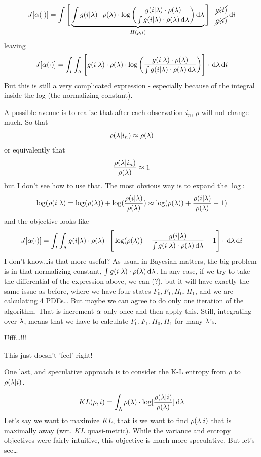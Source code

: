 \documentclass{article}
\begin{document}
$$
J[{\alpha}(\cdot)] =
\int
 \Bigg[\underbrace{
\int {g(i| {\lambda}) \cdot \rho({\lambda})}
		\cdot \log\bigg( \frac{g(i| {\lambda}) \cdot \rho({\lambda})}
		{\int g(i| {\lambda}) \cdot \rho({\lambda}) \, \mathrm{d} {\lambda}} \bigg)
		 \, \mathrm{d} {\lambda}}_{H(\rho,i)}
			   \Bigg]
					  \cdot
					  \frac{\cancel{g(i)}}{\cancel{g(i)}}
					   \, \mathrm{d} i		
					   $$
leaving
$$
J[{\alpha}(\cdot)] =
\int_I
\int_\Lambda
 \Bigg[
 {g(i| {\lambda}) \cdot \rho({\lambda})}
		\cdot \log\bigg( \frac{g(i| {\lambda}) \cdot \rho({\lambda})}
		{\int g(i| {\lambda}) \cdot \rho({\lambda}) \, \mathrm{d} {\lambda}} \bigg)
			   \Bigg]
					  \cdot
		 \, \mathrm{d} {\lambda}
	   \, \mathrm{d} i		
$$
But this is still a very complicated expression - especially because of the integral
inside the log (the normalizing constant).

A possible avenue is to realize that after each observation $i_n$, $\rho$ will
not change much. So that 
$$
\rho ({\lambda} | i_n) \approx \rho({\lambda})
$$
or equivalently that
$$
\frac{\rho ({\lambda} | i_n)}{ \rho({\lambda})} \approx 1
$$
but I don't see how to use that. The most obvious way is to expand the $\log$:
$$
\log(\rho(i|{\lambda}) = 
\log(\rho({\lambda})) +  \log(\frac{\rho(i|{\lambda})}{\rho({\lambda})}) \approx
\log(\rho({\lambda})) +  \frac{\rho(i|{\lambda})}{\rho({\lambda})} - 1)
$$
and the objective looks like
$$
J[{\alpha}(\cdot)] =
\int_I
\int_\Lambda
 {g(i| {\lambda}) \cdot \rho({\lambda})} \cdot 
 \Bigg[
		\log (\rho({\lambda}))
		+
		\frac{g(i| {\lambda})}
		{\int g(i| {\lambda}) \cdot \rho({\lambda}) \, \mathrm{d} {\lambda}}
		- 1
			   \Bigg]
					  \cdot
		 \, \mathrm{d} {\lambda}
	   \, \mathrm{d} i	
$$ 
I don't know\ldots is that more useful? As usual in Bayesian matters, the big
problem is in that normalizing constant, $\int g(i| {\lambda}) \cdot \rho({\lambda})
\, \mathrm{d} {\lambda}$. In any case, if we try to take the differential of the
expression above, we can (?), but it will have exactly the same issue as before,
where we have four states $F_0, F_1, H_0, H_1$, and we are calculating 4 PDEs\ldots
But maybe we can agree to do only one iteration of the algorithm. That is
increment ${\alpha}$ only once and then apply this. Still, integrating over ${\lambda}$,
means that we have to calculate $F_0, F_1, H_0, H_1$ for many ${\lambda}$'s.

Ufff\ldots!!!

This just doesn't 'feel' right!

One last, and speculative approach is to consider the K-L entropy from $\rho$ to
$\rho({\lambda}|i)$.

$$
KL(\rho, i) = \int_\Lambda \rho({\lambda}) \cdot \log[\frac{\rho({\lambda}|i)}{\rho({\lambda})}]
\, \mathrm{d} {\lambda}
$$
Let's say we want to maximize $KL$, that is we want to find $\rho({\lambda}|i)$ that is
maximally away (wrt. $KL$ quasi-metric). While the variance and entropy
objectives were fairly intuitive, this objective is much more speculative. But
let's see\ldots
\end{document}

